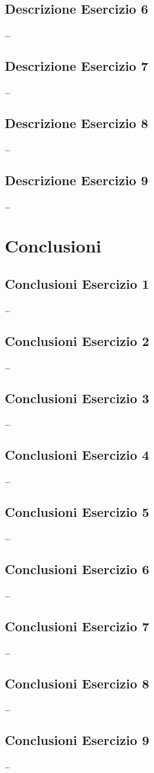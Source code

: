 \documentclass[a4paper]{article}
\begin{document}
\subsection{Descrizione Esercizio 6}
\dots

\subsection{Descrizione Esercizio 7}
\dots

\subsection{Descrizione Esercizio 8}
\dots

\subsection{Descrizione Esercizio 9}
\dots


\section{Conclusioni}
\subsection{Conclusioni Esercizio 1}
\dots

\subsection{Conclusioni Esercizio 2}
\dots

\subsection{Conclusioni Esercizio 3}
\dots

\subsection{Conclusioni Esercizio 4}
\dots

\subsection{Conclusioni Esercizio 5}
\dots

\subsection{Conclusioni Esercizio 6}
\dots

\subsection{Conclusioni Esercizio 7}
\dots

\subsection{Conclusioni Esercizio 8}
\dots

\subsection{Conclusioni Esercizio 9}
\dots
\end{document}
